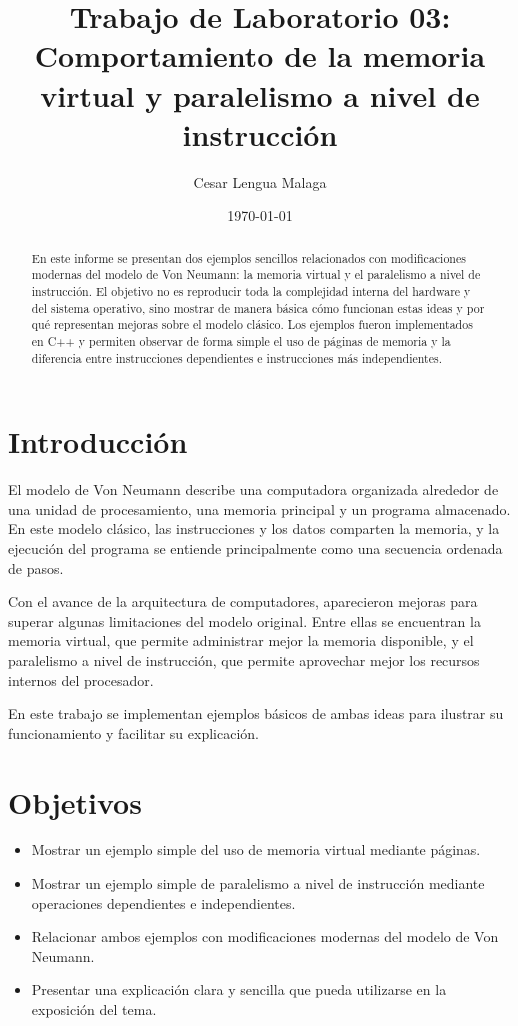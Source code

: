 \documentclass[11pt,a4paper]{article}
\title{Trabajo de Laboratorio 03: Comportamiento de la memoria virtual y paralelismo a nivel de instrucción}
\author{Cesar Lengua Malaga}
\date{\today}
\begin{document}
\maketitle

\begin{abstract}
En este informe se presentan dos ejemplos sencillos relacionados con modificaciones modernas del modelo de Von Neumann: la memoria virtual y el paralelismo a nivel de instrucción. El objetivo no es reproducir toda la complejidad interna del hardware y del sistema operativo, sino mostrar de manera básica cómo funcionan estas ideas y por qué representan mejoras sobre el modelo clásico. Los ejemplos fueron implementados en C++ y permiten observar de forma simple el uso de páginas de memoria y la diferencia entre instrucciones dependientes e instrucciones más independientes.
\end{abstract}

\section{Introducción}

El modelo de Von Neumann describe una computadora organizada alrededor de una unidad de procesamiento, una memoria principal y un programa almacenado. En este modelo clásico, las instrucciones y los datos comparten la memoria, y la ejecución del programa se entiende principalmente como una secuencia ordenada de pasos.

Con el avance de la arquitectura de computadores, aparecieron mejoras para superar algunas limitaciones del modelo original. Entre ellas se encuentran la memoria virtual, que permite administrar mejor la memoria disponible, y el paralelismo a nivel de instrucción, que permite aprovechar mejor los recursos internos del procesador.

En este trabajo se implementan ejemplos básicos de ambas ideas para ilustrar su funcionamiento y facilitar su explicación.

\section{Objetivos}

\begin{itemize}
\item Mostrar un ejemplo simple del uso de memoria virtual mediante páginas.
\item Mostrar un ejemplo simple de paralelismo a nivel de instrucción mediante operaciones dependientes e independientes.
\item Relacionar ambos ejemplos con modificaciones modernas del modelo de Von Neumann.
\item Presentar una explicación clara y sencilla que pueda utilizarse en la exposición del tema.
\end{itemize}
\end{document}
